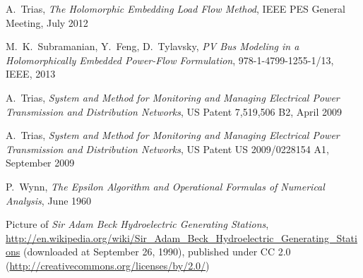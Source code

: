 \begin{thebibliography}{1}
	A.~Trias, \emph{The Holomorphic Embedding Load Flow Method}, IEEE PES General Meeting, July 2012
	
	M.~K.~Subramanian, Y.~Feng, D.~Tylavsky, \emph{PV Bus Modeling in a Holomorphically Embedded Power-Flow Formulation}, 978-1-4799-1255-1/13, IEEE, 2013
	
	A.~Trias, \emph{System and Method for Monitoring and Managing Electrical Power Transmission and Distribution Networks}, US Patent 7,519,506 B2, April 2009
	
	A.~Trias, \emph{System and Method for Monitoring and Managing Electrical Power Transmission and Distribution Networks}, US Patent US 2009/0228154 A1, September 2009
				
	P.~Wynn, \emph{The Epsilon Algorithm and Operational Formulas of Numerical Analysis}, June 1960	
	
	Picture of \emph{Sir Adam Beck Hydroelectric Generating Stations}, \url{http://en.wikipedia.org/wiki/Sir_Adam_Beck_Hydroelectric_Generating_Stations} (downloaded at September 26, 1990), published under CC 2.0 (\url{http://creativecommons.org/licenses/by/2.0/})
\end{thebibliography}